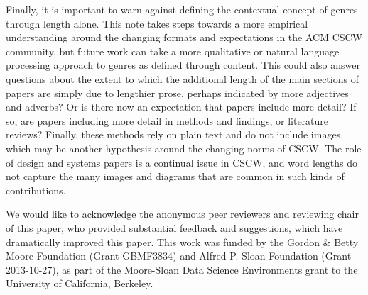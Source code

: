 \documentclass[format=acmsmall, screen=true]{acmart}
\begin{document}
Finally, it is important to warn against defining the contextual concept of genres through length alone. This note takes steps towards a more empirical understanding around the changing formats and expectations in the ACM CSCW community, but future work can take a more qualitative or natural language processing approach to genres as defined through content. This could also answer questions about the extent to which the additional length of the main sections of papers are simply due to lengthier prose, perhaps indicated by more adjectives and adverbs? Or is there now an expectation that papers include more detail? If so, are papers including more detail in methods and findings, or literature reviews? Finally, these methods rely on plain text and do not include images, which may be another hypothesis around the changing norms of CSCW. The role of design and systems papers is a continual issue in CSCW, and word lengths do not capture the many images and diagrams that are common in such kinds of contributions.

\begin{acks}
We would like to acknowledge the anonymous peer reviewers and reviewing chair of this paper, who provided substantial feedback and suggestions, which have dramatically improved this paper. This work was funded by the Gordon \& Betty Moore Foundation (Grant GBMF3834) and Alfred P. Sloan Foundation (Grant 2013-10-27), as part of the Moore-Sloan Data Science Environments grant to the University of California, Berkeley. 
\end{acks}




\appendix
\end{document}
